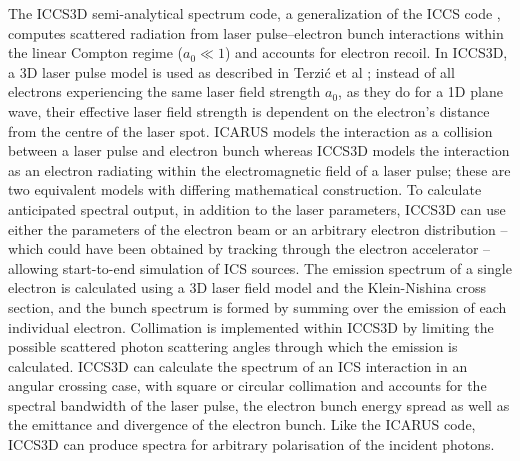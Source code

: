 \documentclass[../main.tex]{subfiles}
\begin{document}
The \textsc{ICCS3D} semi-analytical spectrum code, a generalization of the \textsc{ICCS} code \cite{krafft2016laser,ranjan2018simulation}, computes scattered radiation from laser pulse--electron bunch interactions within the linear Compton regime ($a_{0}\ll 1$) and accounts for electron recoil. In \textsc{ICCS3D}, a 3D laser pulse model is used as described in Terzi\'c et al \cite{terzic2019improving}; instead of all electrons experiencing the same laser field strength $a_{0}$, as they do for a 1D plane wave, their effective laser field strength is dependent on the electron's distance from the centre of the laser spot. \textsc{ICARUS} models the interaction as a collision between a laser pulse and electron bunch whereas \textsc{ICCS3D} models the interaction as an electron radiating within the electromagnetic field of a laser pulse; these are two equivalent models with differing mathematical construction. To calculate anticipated spectral output, in addition to the laser parameters, \textsc{ICCS3D} can use either the parameters of the electron beam or an arbitrary electron distribution -- which could have been obtained by tracking through the electron accelerator -- allowing start-to-end simulation of ICS sources. The emission spectrum of a single electron is calculated using a 3D laser field model and the Klein-Nishina cross section, and the bunch spectrum is formed by summing over the emission of each individual electron. Collimation is implemented within \textsc{ICCS3D} by limiting the possible scattered photon scattering angles through which the emission is calculated. \textsc{ICCS3D} can calculate the spectrum of an ICS interaction in an angular crossing case, with square or circular collimation and accounts for the spectral bandwidth of the laser pulse, the electron bunch energy spread as well as the emittance and divergence of the electron bunch. Like the \textsc{ICARUS} code, \textsc{ICCS3D} can produce spectra for arbitrary polarisation of the incident photons.   
\end{document}
